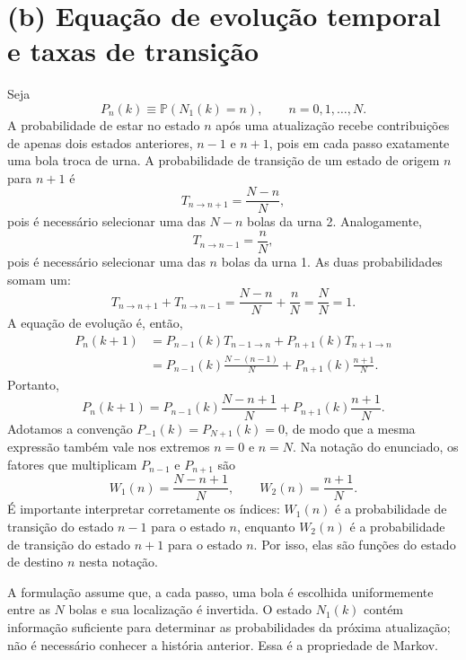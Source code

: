 \documentclass[12pt,a4paper]{article}
\newcommand{\Prob}{\mathbb{P}}
\begin{document}
\section*{(b) Equação de evolução temporal e taxas de transição}
%
Seja
%
\begin{equation}
  P_n(k)\equiv \Prob(N_1(k)=n),\qquad n=0,1,\ldots,N.
\end{equation}
%
A probabilidade de estar no estado $n$ após uma atualização recebe contribuições de apenas dois estados anteriores, $n-1$ e $n+1$, pois em cada passo exatamente uma bola troca de urna. A probabilidade de transição de um estado de origem $n$ para $n+1$ é
%
\begin{equation}
  T_{n\to n+1}=\frac{N-n}{N},
  \label{eq:Tup}
\end{equation}
%
pois é necessário selecionar uma das $N-n$ bolas da urna 2. Analogamente,
%
\begin{equation}
  T_{n\to n-1}=\frac{n}{N},
  \label{eq:Tdown}
\end{equation}
%
pois é necessário selecionar uma das $n$ bolas da urna 1. As duas probabilidades somam um:
\[
T_{n\to n+1}+T_{n\to n-1}=\frac{N-n}{N}+\frac{n}{N}=\frac{N}{N}= 1.
\]
%
A equação de evolução é, então,
%
\begin{align}
  P_n(k+1)
  &=P_{n-1}(k)T_{n-1\to n}+P_{n+1}(k)T_{n+1\to n}\nonumber\\
  &=P_{n-1}(k)\frac{N-(n-1)}{N}+P_{n+1}(k)\frac{n+1}{N}.
\end{align}
%
Portanto,
%
\begin{equation}
  \boxed{P_n(k+1)=P_{n-1}(k)\frac{N-n+1}{N}+P_{n+1}(k)\frac{n+1}{N}.}
  \label{eq:master}
\end{equation}
Adotamos a convenção $P_{-1}(k)=P_{N+1}(k)=0$, de modo que a mesma expressão também vale nos extremos $n=0$ e $n=N$. Na notação do enunciado, os fatores que multiplicam $P_{n-1}$ e $P_{n+1}$ são
%
\begin{equation}
  \boxed{W_1(n)=\frac{N-n+1}{N},\qquad W_2(n)=\frac{n+1}{N}.}
  \label{eq:W12}
\end{equation}
%
É importante interpretar corretamente os índices: $W_1(n)$ é a probabilidade de transição do estado $n-1$ para o estado $n$, enquanto $W_2(n)$ é a probabilidade de transição do estado $n+1$ para o estado $n$. Por isso, elas são funções do estado de destino $n$ nesta notação.

A formulação assume que, a cada passo, uma bola é escolhida uniformemente entre as $N$ bolas e sua localização é invertida. O estado $N_1(k)$ contém informação suficiente para determinar as probabilidades da próxima atualização; não é necessário conhecer a história anterior. Essa é a propriedade de Markov.
\end{document}
